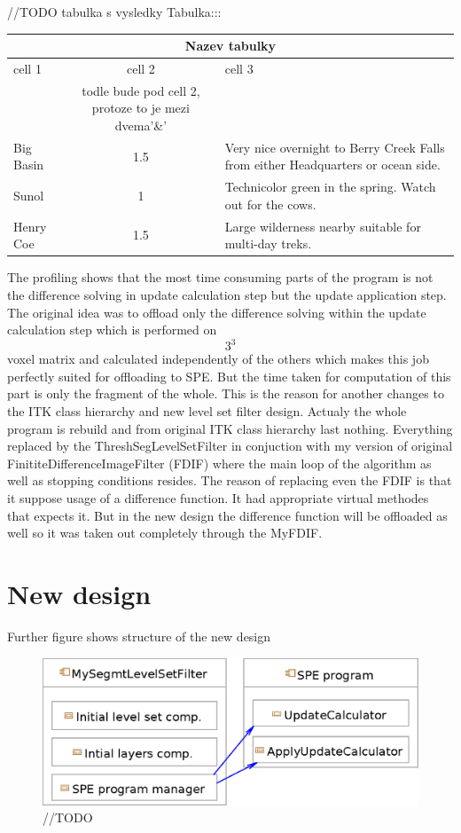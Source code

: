 //TODO tabulka s vysledky
Tabulka:::
\begin{center}
\begin{tabular}{|l|c|p{3.5in}|}
\hline
\multicolumn{3}{|c|}{Nazev tabulky}\\ 
\hline cell 1&cell 2&cell 3\\&todle bude pod cell 2, protoze to je mezi dvema'\&' &\\ 
\hline Big Basin&1.5&Very nice overnight to Berry Creek Falls from
either Headquarters or ocean side.\\ 
\hline Sunol&1&Technicolor green in the spring. Watch out for the cows.\\ 
\hline Henry Coe&1.5&Large wilderness nearby suitable for multi-day treks.\\ 
\hline
\end{tabular}
\end{center}

The profiling shows that the most time consuming parts of the program is not the difference solving in update calculation step but the update application step. The original idea was to offload only the difference solving within the update calculation step which is performed on $$3^3$$ voxel matrix and calculated independently of the others which makes this job perfectly suited for offloading to SPE. But the time taken for computation of this part is only the fragment of the whole. This is the reason for another changes to the ITK class hierarchy and new level set filter design. Actualy the whole program is rebuild and from original ITK class hierarchy last nothing. Everything replaced by the ThreshSegLevelSetFilter in conjuction with my version of original FinititeDifferenceImageFilter (FDIF) where the main loop of the algorithm as well as stopping conditions resides. The reason of replacing even the FDIF is that it suppose usage of a difference function. It had appropriate virtual methodes that expects it. But in the new design the difference function will be offloaded as well so it was taken out completely through the MyFDIF.

\section{New design}

Further figure shows structure of the new design

\begin{figure}
    \centering
    \includegraphics[width=15cm]{data/newDesign}
    \caption[Diagram of new design components]{//TODO}
    \label{fg:newDesign}
\end{figure}

